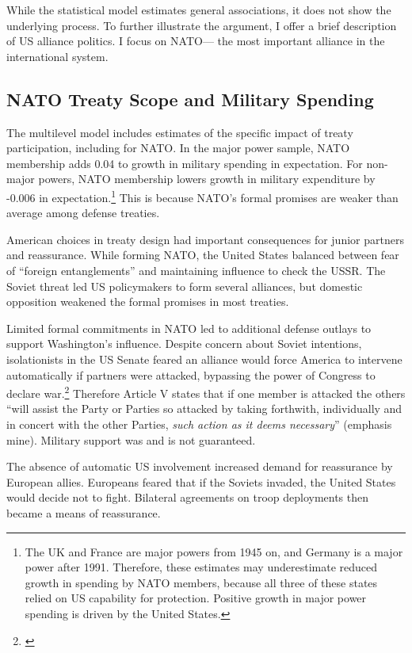 \documentclass[12pt]{article}
\begin{document}
While the statistical model estimates general associations, it does not show the underlying process. 
To further illustrate the argument, I offer a brief description of US alliance politics.   
I focus on NATO--- the most important alliance in the international system.  


\subsection{NATO Treaty Scope and Military Spending}


The multilevel model includes estimates of the specific impact of treaty participation, including for NATO. 
In the major power sample, NATO membership adds 0.04 to growth in military spending in expectation.
For non-major powers, NATO membership lowers growth in military expenditure by -0.006 in expectation.\footnote{
The UK and France are major powers from 1945 on, and Germany is a major power after 1991. Therefore, these estimates may underestimate reduced growth in spending by NATO members, because all three of these states relied on US capability for protection. Positive growth in major power spending is driven by the United States.}
This is because NATO's formal promises are weaker than average among defense treaties. 


American choices in treaty design had important consequences for junior partners and reassurance. 
While forming NATO, the United States balanced between fear of ``foreign entanglements'' and maintaining influence to check the USSR.
The Soviet threat led US policymakers to form several alliances, but domestic opposition weakened the formal promises in most treaties. 


Limited formal commitments in NATO led to additional defense outlays to support Washington's influence.
Despite concern about Soviet intentions, isolationists in the US Senate feared an alliance would force America to intervene automatically if partners were attacked, bypassing the power of Congress to declare war.\footnote{\citep[pg. 280-1]{Acheson1969}}
Therefore Article V states that if one member is attacked the others ``will assist the Party or Parties so attacked by taking forthwith, individually and in concert with the other Parties, \emph{such action as it deems necessary}'' (emphasis mine). 
Military support was and is not guaranteed. 


The absence of automatic US involvement increased demand for reassurance by European allies. 
Europeans feared that if the Soviets invaded, the United States would decide not to fight. 
Bilateral agreements on troop deployments then became a means of reassurance. 
\end{document}
